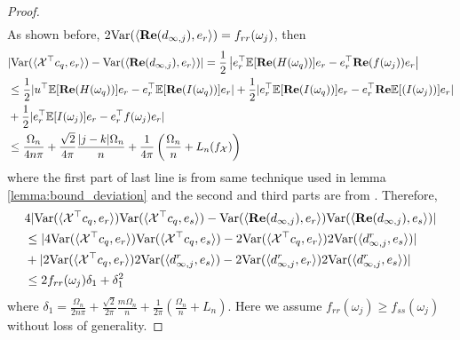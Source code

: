 \begin{proof}
\begin{equation}
\begin{aligned}
\end{aligned}
\end{equation}
As shown before, $2\mbox{Var}(\langle {\bf Re}(d_{\infty, j}), e_r\rangle) = f_{rr}(\omega_j)$,  then 
\begin{equation}
\label{eq:help_bound1}
\begin{aligned}
&|\mbox{Var}(\langle \mathcal{X}^\top c_q,e_r\rangle) -  \mbox{Var}(\langle {\bf Re}(d_{\infty, j}),e_r\rangle)| =\frac{1}{2} \left|e_r^\top \mathbb{E}[{\bf Re}(H(\omega_q))]e_r - e_r^\top {\bf Re}(f(\omega_j))e_r\right|\\
& \le \frac{1}{2}|u^\top \mathbb{E}[{\bf Re}(H(\omega_q))]e_r - e_r^\top  \mathbb{E}[{\bf Re}(I(\omega_q))]e_r|+\frac{1}{2}|e_r^\top\mathbb{E}[{\bf Re}(I(\omega_q))]e_r-e_r^\top  {\bf Re}\mathbb{E}[(I(\omega_j))]e_r|\\
&+ \frac{1}{2}|e_r^\top\mathbb{E}[I(\omega_j)]e_r - e_r^\top  f(\omega_j)e_r|\\
&\le  \frac{\Omega_n}{4n\pi}+\frac{\sqrt{2}}{4\pi}\frac{|j-k|\Omega_n}{n}+ \frac{1}{4\pi}\left(\frac{\Omega_n}{n} + L_n(f_\mathcal{X})\right)\\
\end{aligned}
\end{equation}
where the first part of last line is from same technique used in lemma \ref{lemma:bound_deviation} and the second and third parts are from \cite{sun2018large}. 
Therefore, 
\begin{equation}
\begin{aligned}
&4|\mbox{Var}(\langle \mathcal{X}^\top  c_q,e_r\rangle)\mbox{Var}({\langle \mathcal{X}^\top   c_q,e_s\rangle)} - \mbox{Var}(\langle {\bf Re}(d_{\infty, j}) ,e_r\rangle)\mbox{Var}(\langle {\bf Re}(d_{\infty, j}), e_s\rangle)| \\
& \le |4\mbox{Var}(\langle \mathcal{X}^\top c_q,e_r\rangle)\mbox{Var}(\langle \mathcal{X}^\top  c_q,e_s\rangle)- 2\mbox{Var}(\langle \mathcal{X}^\top  c_q,e_r\rangle)2\mbox{Var}(\langle d^{r}_{\infty, j},e_s\rangle)| \\
&+|2\mbox{Var}(\langle \mathcal{X}^\top  c_q,e_r\rangle)2\mbox{Var}(\langle d^{r}_{\infty, j},e_s\rangle)- 2\mbox{Var}(\langle d^{r}_{\infty, j},e_r\rangle)2\mbox{Var}(\langle d^{r}_{\infty, j},e_s\rangle)|\\
&\le 2f_{rr}(\omega_j) \delta_1+\delta_1^2
\end{aligned}
\end{equation}
where $\delta_1 =  \frac{\Omega_n}{2n\pi}+\frac{\sqrt{2}}{2\pi}\frac{m\Omega_n}{n}+ \frac{1}{2\pi}\left(\frac{\Omega_n}{n} + L_n\right)$. Here we assume $f_{rr}(\omega_j)\geq f_{ss}(\omega_j)$ without loss of generality. 

\end{proof}
